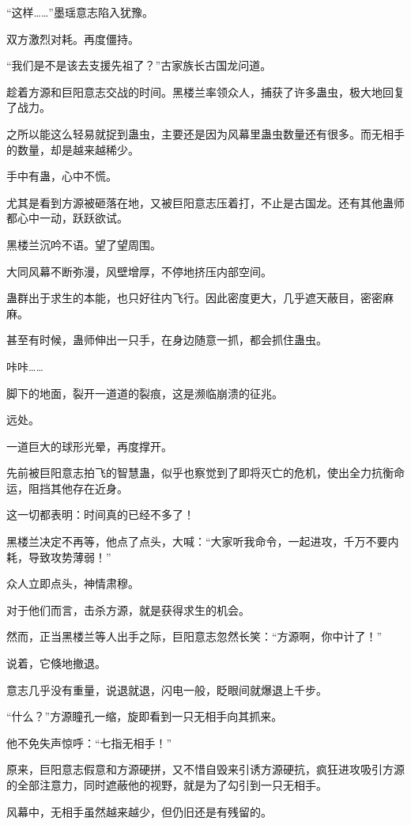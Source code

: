 \begin{this_body}
“这样……”墨瑶意志陷入犹豫。

双方激烈对耗。再度僵持。

“我们是不是该去支援先祖了？”古家族长古国龙问道。

趁着方源和巨阳意志交战的时间。黑楼兰率领众人，捕获了许多蛊虫，极大地回复了战力。

之所以能这么轻易就捉到蛊虫，主要还是因为风幕里蛊虫数量还有很多。而无相手的数量，却是越来越稀少。

手中有蛊，心中不慌。

尤其是看到方源被砸落在地，又被巨阳意志压着打，不止是古国龙。还有其他蛊师都心中一动，跃跃欲试。

黑楼兰沉吟不语。望了望周围。

大同风幕不断弥漫，风壁增厚，不停地挤压内部空间。

蛊群出于求生的本能，也只好往内飞行。因此密度更大，几乎遮天蔽目，密密麻麻。

甚至有时候，蛊师伸出一只手，在身边随意一抓，都会抓住蛊虫。

咔咔……

脚下的地面，裂开一道道的裂痕，这是濒临崩溃的征兆。

远处。

一道巨大的球形光晕，再度撑开。

先前被巨阳意志拍飞的智慧蛊，似乎也察觉到了即将灭亡的危机，使出全力抗衡命运，阻挡其他存在近身。

这一切都表明：时间真的已经不多了！

黑楼兰决定不再等，他点了点头，大喊：“大家听我命令，一起进攻，千万不要内耗，导致攻势薄弱！”

众人立即点头，神情肃穆。

对于他们而言，击杀方源，就是获得求生的机会。

然而，正当黑楼兰等人出手之际，巨阳意志忽然长笑：“方源啊，你中计了！”

说着，它倏地撤退。

意志几乎没有重量，说退就退，闪电一般，眨眼间就爆退上千步。

“什么？”方源瞳孔一缩，旋即看到一只无相手向其抓来。

他不免失声惊呼：“七指无相手！”

原来，巨阳意志假意和方源硬拼，又不惜自毁来引诱方源硬抗，疯狂进攻吸引方源的全部注意力，同时遮蔽他的视野，就是为了勾引到一只无相手。

风幕中，无相手虽然越来越少，但仍旧还是有残留的。


\end{this_body}
